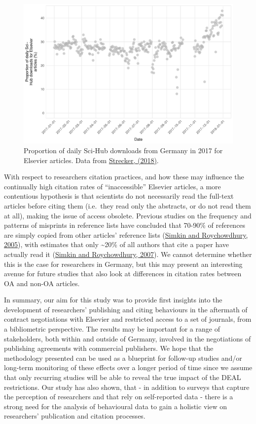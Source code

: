 \documentclass[
]{article}
\begin{document}
\begin{figure}

{\centering \includegraphics[width=0.75\linewidth]{analysis_files/figure-latex/scihub-germany-1} 

}

\caption{Proportion of daily Sci-Hub downloads from Germany in 2017 for Elsevier articles. Data from \href{http://doi.org/10.5281/zenodo.1286284}{Strecker, (2018)}.}\label{fig:scihub-germany}
\end{figure}

With respect to researchers citation practices, and how these may influence the continually high citation rates of ``inaccessible'' Elsevier articles, a more contentious hypothesis is that scientists do not necessarily read the full-text articles before citing them (i.e.~they read only the abstracts, or do not read them at all), making the issue of access obsolete. Previous studies on the frequency and patterns of misprints in reference lists have concluded that 70-90\% of references are simply copied from other articles' reference lists (\href{https://doi.org/10.1007/s11192-005-0028-2}{Simkin and Roychowdhury, 2005}), with estimates that only \textasciitilde20\% of all authors that cite a paper have actually read it (\href{https://doi.org/10.1002/asi.20653}{Simkin and Roychowdhury, 2007}). We cannot determine whether this is the case for researchers in Germany, but this may present an interesting avenue for future studies that also look at differences in citation rates between OA and non-OA articles.

In summary, our aim for this study was to provide first insights into the development of researchers' publishing and citing behaviours in the aftermath of contract negotiations with Elsevier and restricted access to a set of journals, from a bibliometric perspective. The results may be important for a range of stakeholders, both within and outside of Germany, involved in the negotiations of publishing agreements with commercial publishers. We hope that the methodology presented can be used as a blueprint for follow-up studies and/or long-term monitoring of these effects over a longer period of time since we assume that only recurring studies will be able to reveal the true impact of the DEAL restrictions. Our study has also shown, that - in addition to surveys that capture the perception of researchers and that rely on self-reported data - there is a strong need for the analysis of behavioural data to gain a holistic view on researchers' publication and citation processes.
\end{document}
